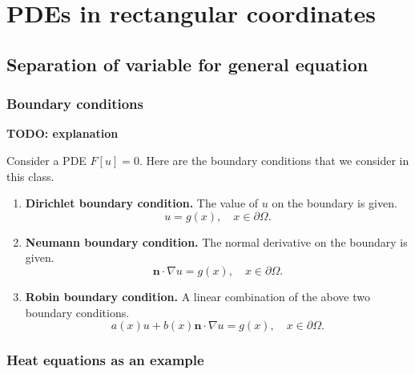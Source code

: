\section{PDEs in rectangular coordinates}

\subsection{Separation of variable for general equation}

\subsubsection{Boundary conditions}

\textbf{TODO: explanation}

\begin{definition} Consider a PDE $F[u] = 0$. Here are the boundary conditions that we consider in this class.
    \begin{enumerate}
        \item \textbf{Dirichlet boundary condition.} The value of $u$ on the boundary is given.
        \begin{equation}\label{eq.Dirichlet_boundary}
            u=g(x), \quad x \in \partial \Omega .
        \end{equation}
        
        \item \textbf{Neumann boundary condition.} The normal derivative on the boundary is given.
        \begin{equation}\label{eq.Neumann_boundary}
            \mathbf{n} \cdot \nabla u=g(x), \quad x \in \partial \Omega .
        \end{equation}
        
        \item \textbf{Robin boundary condition.} A linear combination of the above two boundary conditions. 
        \begin{equation}\label{eq.Robin_boundary}
            a(x) u+b(x) \mathbf{n} \cdot \nabla u=g(x), \quad x \in \partial \Omega .
        \end{equation}
    \end{enumerate}
\end{definition}

\subsubsection{Heat equations as an example}

